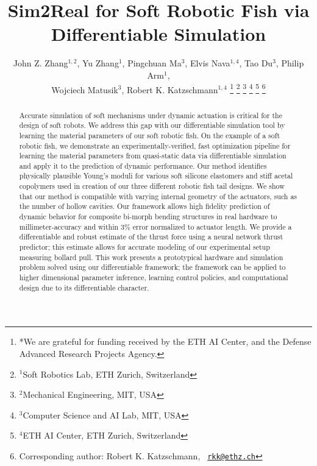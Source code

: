 \documentclass[letterpaper, 10 pt, conference]{ieeeconf}
\title{\LARGE \bf
Sim2Real for Soft Robotic Fish via Differentiable Simulation
}
\author{John Z. Zhang$^{1,2}$, Yu Zhang$^{1}$, Pingchuan Ma$^{3}$,  Elvis Nava$^{1,4}$, Tao Du$^{3}$, Philip Arm$^{1}$, \\ Wojciech Matusik$^{3}$, Robert K. Katzschmann$^{1,4}$%
\thanks{*We are grateful for funding received by the ETH AI Center, and the Defense Advanced Research Projects Agency.}%
\thanks{$^{1}$Soft Robotics Lab, ETH Zurich, Switzerland}%
\thanks{$^{2}$Mechanical Engineering, MIT, USA}%
\thanks{$^{3}$Computer Science and AI Lab, MIT, USA}%
\thanks{$^{4}$ETH AI Center, ETH Zurich, Switzerland}
\thanks{Corresponding author: Robert K. Katzschmann, {\tt\footnotesize 
\href{mailto:rkk@ethz.ch}{rkk@ethz.ch}}}%
}
\begin{document}
\maketitle
\thispagestyle{empty}
\pagestyle{empty}

\begin{abstract}
Accurate simulation of soft mechanisms under dynamic actuation is critical for the design of soft robots.
We address this gap with our differentiable simulation tool by learning the material parameters of our soft robotic fish.
On the example of a soft robotic fish, we demonstrate an experimentally-verified, fast optimization pipeline for learning the material parameters from quasi-static data via differentiable simulation and apply it to the prediction of dynamic performance.
Our method identifies physically plausible Young’s moduli for various soft silicone elastomers and stiff acetal copolymers used in creation of our three different robotic fish tail designs. We show that our method is compatible with varying internal geometry of the actuators, such as the number of hollow cavities.
Our framework allows high fidelity prediction of dynamic behavior for composite bi-morph bending structures in real hardware to millimeter-accuracy and within $3\%$ error normalized to actuator length.
We provide a differentiable and robust estimate of the thrust force using a neural network thrust predictor; this estimate allows for accurate modeling of our experimental setup measuring bollard pull. 
This work presents a prototypical hardware and simulation problem solved using our differentiable framework; the framework can be applied to higher dimensional parameter inference, learning control policies, and computational design due to its differentiable character.
\end{abstract}















\end{document}
